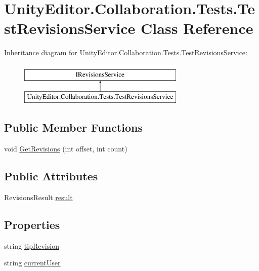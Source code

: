 \hypertarget{class_unity_editor_1_1_collaboration_1_1_tests_1_1_test_revisions_service}{}\section{Unity\+Editor.\+Collaboration.\+Tests.\+Test\+Revisions\+Service Class Reference}
\label{class_unity_editor_1_1_collaboration_1_1_tests_1_1_test_revisions_service}
Inheritance diagram for Unity\+Editor.\+Collaboration.\+Tests.\+Test\+Revisions\+Service\+:\begin{figure}[H]
\begin{center}
\leavevmode
\includegraphics[height=2.000000cm]{class_unity_editor_1_1_collaboration_1_1_tests_1_1_test_revisions_service}
\end{center}
\end{figure}
\subsection*{Public Member Functions}
\begin{DoxyCompactItemize}
\item 
void \mbox{\hyperlink{class_unity_editor_1_1_collaboration_1_1_tests_1_1_test_revisions_service_a0309e833c4bbd83f1e67d93042b3f38d}{Get\+Revisions}} (int offset, int count)
\end{DoxyCompactItemize}
\subsection*{Public Attributes}
\begin{DoxyCompactItemize}
\item 
Revisions\+Result \mbox{\hyperlink{class_unity_editor_1_1_collaboration_1_1_tests_1_1_test_revisions_service_a140775acd86fdcf454ad1c41143ad25e}{result}}
\end{DoxyCompactItemize}
\subsection*{Properties}
\begin{DoxyCompactItemize}
\item 
string \mbox{\hyperlink{class_unity_editor_1_1_collaboration_1_1_tests_1_1_test_revisions_service_ae58e0928042a3d7eece1dc85e4a99ffc}{tip\+Revision}}
\item 
string \mbox{\hyperlink{class_unity_editor_1_1_collaboration_1_1_tests_1_1_test_revisions_service_aef545b22eb5a9f095fce9077b4c0b479}{current\+User}}
\end{DoxyCompactItemize}
